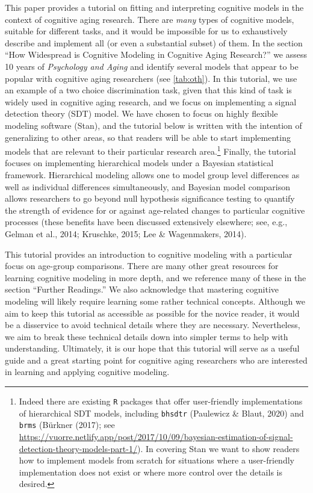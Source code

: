 \documentclass[
  english,
  ,man,floatsintext]{apa6}
\begin{document}
This paper provides a tutorial on fitting and interpreting cognitive models in the context of cognitive aging research. There are \emph{many} types of cognitive models, suitable for different tasks, and it would be impossible for us to exhaustively describe and implement all (or even a substantial subset) of them. In the section \enquote{How Widespread is Cognitive Modeling in Cognitive Aging Research?} we assess 10 years of \emph{Psychology and Aging} and identify several models that appear to be popular with cognitive aging researchers (see \ref{tab:oth}). In this tutorial, we use an example of a two choice discrimination task, given that this kind of task is widely used in cognitive aging research, and we focus on implementing a signal detection theory (SDT) model. We have chosen to focus on highly flexible modeling software (Stan), and the tutorial below is written with the intention of generalizing to other areas, so that readers will be able to start implementing models that are relevant to their particular research area.\footnote{Indeed there are existing \texttt{R} packages that offer user-friendly implementations of hierarchical SDT models, including \texttt{bhsdtr} (Paulewicz \& Blaut, 2020) and \texttt{brms} (Bürkner (2017); see \url{https://vuorre.netlify.app/post/2017/10/09/bayesian-estimation-of-signal-detection-theory-models-part-1/}). In covering Stan we want to show readers how to implement models from scratch for situations where a user-friendly implementation does not exist or where more control over the details is desired.} Finally, the tutorial focuses on implementing hierarchical models under a Bayesian statistical framework. Hierarchical modeling allows one to model group level differences as well as individual differences simultaneously, and Bayesian model comparison allows researchers to go beyond null hypothesis significance testing to quantify the strength of evidence for or against age-related changes to particular cognitive processes (these benefits have been discussed extensively elsewhere; see, e.g., Gelman et al., 2014; Kruschke, 2015; Lee \& Wagenmakers, 2014).

This tutorial provides an introduction to cognitive modeling with a particular focus on age-group comparisons. There are many other great resources for learning cognitive modeling in more depth, and we reference many of these in the section \enquote{Further Readings.} We also acknowledge that mastering cognitive modeling will likely require learning some rather technical concepts. Although we aim to keep this tutorial as accessible as possible for the novice reader, it would be a disservice to avoid technical details where they are necessary. Nevertheless, we aim to break these technical details down into simpler terms to help with understanding. Ultimately, it is our hope that this tutorial will serve as a useful guide and a great starting point for cognitive aging researchers who are interested in learning and applying cognitive modeling.
\end{document}
